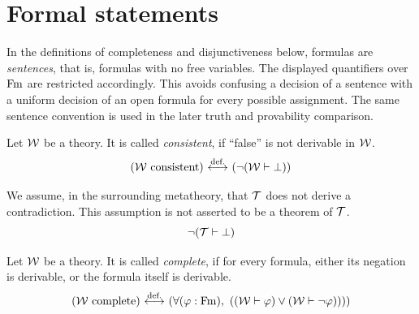 
\section{Formal statements}
In the definitions of completeness and disjunctiveness below, formulas are
\emph{sentences}, that is, formulas with no free variables. The displayed
quantifiers over $\mathrm{Fm}$ are restricted accordingly. This avoids confusing a
decision of a sentence with a uniform decision of an open formula for every
possible assignment. The same sentence convention is used in the later
truth and provability comparison.
\begin{definition}%
Let ${\mathcal{W}}$ be a theory.
It is called \textit{consistent}, if ``false'' is not derivable in ${\mathcal{W}}$.
\[
({\mathcal{W}}\text{ consistent})
\ {\stackrel{{\textrm{def.}}}{\longleftrightarrow}}\ 
(\neg ({\mathcal{W}} \vdash \bot))
\]
\end{definition}

\begin{axiom}%
We %
assume, in the surrounding metatheory, that $\mathcal{T}$ does not derive a
contradiction. This assumption is not asserted to be a theorem of $\mathcal{T}$.
\[
\neg (\mathcal{T} \vdash \bot)
\]
\end{axiom}

\begin{definition}%
Let ${\mathcal{W}}$ be a theory.
It is called \textit{complete}, if for every formula, either its negation is derivable, or the formula itself is derivable.
\[
(\Wau\text{ complete})
\iffdef
(
\forall (\phi:\Fm),\ %
(
(\Wau \vdash \phi)
\lor
(\Wau \vdash \neg\phi))
)
)
\]
\end{definition}


